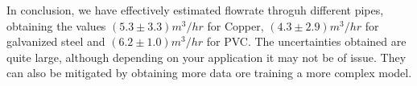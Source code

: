 In conclusion, we have effectively estimated flowrate throguh different pipes, obtaining the values $(5.3\pm 3.3)m^3/hr$ for Copper, $(4.3\pm 2.9)m^3/hr$ for galvanized steel and $(6.2\pm 1.0)m^3/hr$ for PVC. The uncertainties obtained are quite large, although depending on your application it may not be of issue. They can also be mitigated by obtaining more data ore training a more complex model.